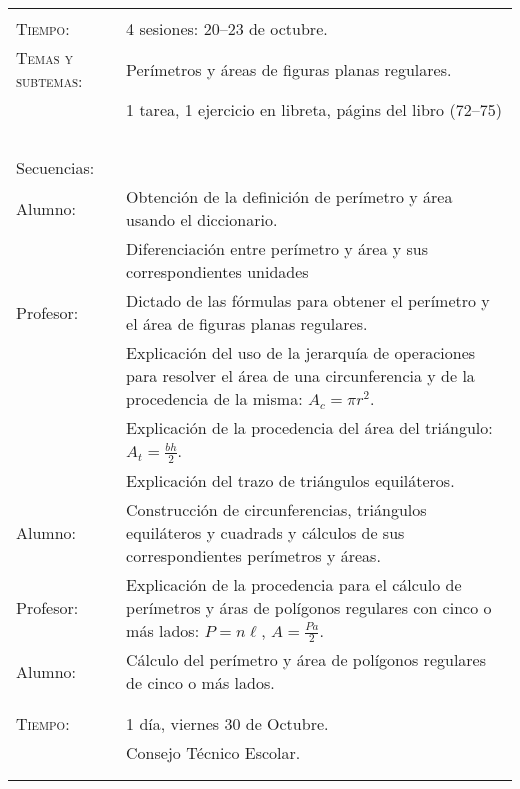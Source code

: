 \documentclass[letterpaper,10pt]{article}
\begin{document}
\begin{tabular}[t]{R{0.25\textwidth}p{0.71\textwidth}}

\\ \hline \\
    \textsc{Tiempo:}                    & 4 sesiones: 20--23  de octubre. \\
    \textsc{Temas y subtemas:}          & Per\'imetros y \'areas de figuras planas regulares.\\
              & 1 tarea, 1 ejercicio en libreta, p\'agins del libro (72--75) \\ \\
    \large{\sc Secuencias:} \\
    Alumno:     & Obtenci\'on de la definici\'on de per\'imetro y \'area usando el diccionario. \\
                & Diferenciaci\'on entre per\'imetro y \'area y sus correspondientes unidades \\
    Profesor:   & Dictado de las f\'ormulas para obtener el per\'imetro y el \'area de figuras planas regulares. \\
                & Explicaci\'on del uso de la jerarqu\'ia de operaciones para resolver el \'area de una circunferencia y de la procedencia de la misma: $A_{c} = \pi r^{2}$. \\ 
                & Explicaci\'on de la procedencia del \'area del tri\'angulo: $A_{t} = \frac{bh}{2}$. \\
                & Explicaci\'on del trazo de tri\'angulos equil\'ateros. \\
    Alumno:     & Construcci\'on de circunferencias, tri\'angulos equil\'ateros y cuadrads y c\'alculos de sus correspondientes per\'imetros y \'areas. \\
    Profesor:   & Explicaci\'on de la procedencia para el c\'alculo de per\'imetros y \'aras de pol\'igonos regulares con cinco o m\'as lados: $P = n\ell$, $A = \frac{Pa}{2} $. \\
    Alumno:     & C\'alculo del per\'imetro y \'area de pol\'igonos regulares de cinco o m\'as lados. \\
\\ \hline \\
    \textsc{Tiempo:}& 1 d\'ia, viernes 30 de Octubre. \\
                    & {\Large \sc Consejo T\'ecnico Escolar.} \\ 
\\ \hline \\

\end{tabular}
\end{document}
